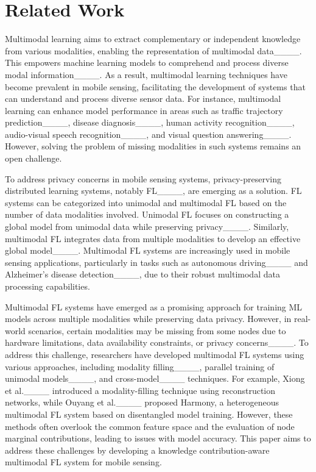 \section{Related Work}
Multimodal learning aims to extract complementary or independent knowledge from various modalities, enabling the representation of multimodal data____. This empowers machine learning models to comprehend and process diverse modal information____. As a result, multimodal learning techniques have become prevalent in mobile sensing, facilitating the development of systems that can understand and process diverse sensor data. For instance, multimodal learning can enhance model performance in areas such as traffic trajectory prediction____, disease diagnosis____, human activity recognition____, audio-visual speech recognition____, and visual question answering____. However, solving the problem of missing modalities in such systems remains an open challenge.



 To address privacy concerns in mobile sensing systems, privacy-preserving distributed learning systems, notably FL____, are emerging as a solution. FL systems can be categorized into unimodal and multimodal FL based on the number of data modalities involved. Unimodal FL focuses on constructing a global model from unimodal data while preserving privacy____. Similarly, multimodal FL integrates data from multiple modalities to develop an effective global model____. Multimodal FL systems are increasingly used in mobile sensing applications, particularly in tasks such as autonomous driving____ and Alzheimer's disease detection____, due to their robust multimodal data processing capabilities.


 Multimodal FL systems have emerged as a promising approach for training ML models across multiple modalities while preserving data privacy. However, in real-world scenarios, certain modalities may be missing from some nodes due to hardware limitations, data availability constraints, or privacy concerns____. To address this challenge, researchers have developed multimodal FL systems using various approaches, including modality filling____, parallel training of unimodal models____, and cross-model____ techniques. For example, Xiong et al.____ introduced a modality-filling technique using reconstruction networks, while Ouyang et al.____ proposed Harmony, a heterogeneous multimodal FL system based on disentangled model training. However, these methods often overlook the common feature space and the evaluation of node marginal contributions, leading to issues with model accuracy. This paper aims to address these challenges by developing a knowledge contribution-aware multimodal FL system for mobile sensing.